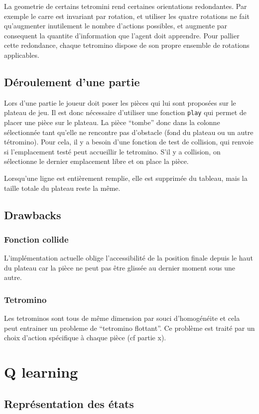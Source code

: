 \documentclass{article}
\begin{document}
La geometrie de certains tetromini rend certaines orientations redondantes. Par
exemple le carre est invariant par rotation, et utiliser les quatre rotations
ne fait qu'augmenter inutilement le nombre d'actions possibles, et augmente par
consequent la quantite d'information que l'agent doit apprendre. Pour pallier
cette redondance, chaque tetromino dispose de son propre ensemble de rotations
applicables.

\subsection{D\'eroulement d'une partie}
Lors d'une partie le joueur doit poser les pièces qui lui sont proposées sur
le plateau de jeu. Il est donc nécessaire d'utiliser une fonction \texttt{play}
qui permet de placer une pièce sur le plateau. La pièce ``tombe'' donc dans la
colonne sélectionnée tant qu'elle ne rencontre pas d'obstacle (fond du plateau
ou un autre tétromino). Pour cela, il y a besoin d'une fonction de test de
collision, qui renvoie si l'emplacement testé peut accueillir le tetromino.
S'il y a collision, on sélectionne le dernier emplacement libre et on place la
pièce.

Lorsqu'une ligne est entièrement remplie, elle est supprimée du tableau, mais
la taille totale du plateau reste la même.

\subsection{Drawbacks}
\subsubsection{Fonction collide}
L'implémentation actuelle oblige l'accessibilit\'e de la position finale depuis
le haut du plateau car la pi\`ece ne peut pas \^etre gliss\'ee au dernier moment
sous une autre.
\subsubsection{Tetromino}
Les tetrominos sont tous de même dimension par souci d'homogénéite et cela
peut entrainer un probleme de ``tetromino flottant''. Ce problème est traité par
un choix d'action spécifique à chaque pièce (cf partie x).
\section{Q learning}

\subsection{Représentation des états}
\end{document}
